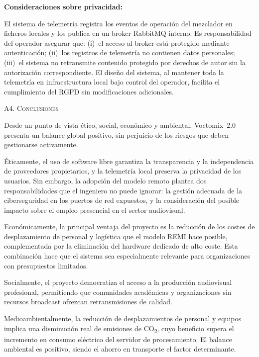 \vspace{0.15cm}
\textbf{Consideraciones sobre privacidad:}

El sistema de telemetría registra los eventos de operación del mezclador en ficheros locales y
los publica en un broker RabbitMQ interno. Es responsabilidad del operador asegurar que:
(i)~el acceso al broker está protegido mediante autenticación; (ii)~los registros de telemetría no
contienen datos personales; (iii)~el sistema no retransmite contenido protegido por derechos de
autor sin la autorización correspondiente. El diseño del sistema, al mantener toda la telemetría
en infraestructura local bajo control del operador, facilita el cumplimiento del RGPD sin
modificaciones adicionales.
\vspace{0.3cm}

\Large{\textsc{\textcolor{nar}{A4. Conclusiones}}}
\vspace{0.2cm}

\normalsize{Desde un punto de vista ético, social, económico y ambiental, Voctomix~2.0 presenta
un balance global positivo, sin perjuicio de los riesgos que deben gestionarse activamente.

Éticamente, el uso de software libre garantiza la transparencia y la independencia de proveedores
propietarios, y la telemetría local preserva la privacidad de los usuarios. Sin embargo, la
adopción del modelo remoto plantea dos responsabilidades que el ingeniero no puede ignorar: la
gestión adecuada de la ciberseguridad en los puertos de red expuestos, y la consideración del
posible impacto sobre el empleo presencial en el sector audiovisual.

Económicamente, la principal ventaja del proyecto es la reducción de los costes de desplazamiento
de personal y logística que el modelo REMI hace posible, complementada por la eliminación del
hardware dedicado de alto coste. Esta combinación hace que el sistema sea especialmente relevante
para organizaciones con presupuestos limitados.

Socialmente, el proyecto democratiza el acceso a la producción audiovisual profesional,
permitiendo que comunidades académicas y organizaciones sin recursos broadcast ofrezcan
retransmisiones de calidad.

Medioambientalmente, la reducción de desplazamientos de personal y equipos implica una disminución
real de emisiones de CO\textsubscript{2}, cuyo beneficio supera el incremento en consumo eléctrico
del servidor de procesamiento. El balance ambiental es positivo, siendo el ahorro en transporte
el factor determinante.}

